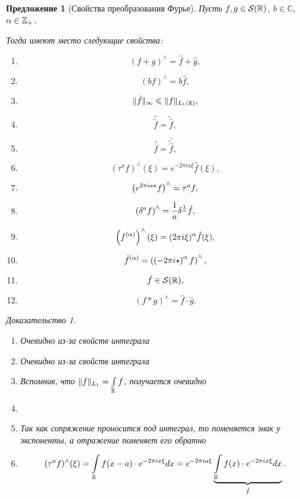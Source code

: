 \documentclass[a5paper, 10pt]{article}
\theoremstyle{definition}
\theoremstyle{plain}
\newtheorem*{Prop}{Предложение}
\theoremstyle{remark}
\newtheorem*{Proof}{Доказательство}
\begin{document}
    \begin{Prop}[Свойства преобразования Фурье]
        Пусть $f,g \in \mathcal{S}(\mathbb{R})$, $b\in \mathbb{C}$, $\alpha\in\mathbb{Z}_+$.

        Тогда имеют место следующие свойства:
         \begin{enumerate}
             \item \[
                     (f+g)^\wedge = \hat{f} + \hat{g},
             \] 
         \item \[
                 (bf)^\wedge = b\hat{f},
         \] 
     \item \[
             \|\hat{f}\|_\infty \leqslant \|f\|_{L_1(\mathbb{R})},
     \] 
 \item \[
         \hat{\tilde{f}} = \tilde{\hat{f}},
 \] 
\item \[
        \hat{\overline{f}} = \overline{\tilde{\hat{f}}},
\] 
\item \[
        (\tau^a f)^\wedge (\xi) = e^{-2\pi i a \xi} \hat{f}(\xi),
\] 
\item \[
        \left(e^{2\pi i a \star} f\right)^\wedge = \tau^a f,
\] 
\item \[
        \left(\delta^a f\right)^\wedge = \frac1a \delta^{\frac{1}{a}} \hat{f},
\] 
\item \[
    \left(f^{(\alpha)}\right)^\wedge (\xi) = (2\pi i \xi)^\alpha \hat{f}(\xi),
\] 
\item \[
        \hat{f}^{(\alpha)} = \left(\left(-2\pi i \star\right)^\alpha f\right)^\wedge,
\] 
\item \[
    \hat{f} \in \mathcal{S}(\mathbb{R}),
\] 
\item \[
        (f*g)^\wedge = \hat{f} \cdot \hat{g}.
\] 
        \end{enumerate}
        \begin{Proof}
            \begin{enumerate}
                \item Очевидно из-за свойств интеграла
                \item Очевидно из-за свойств интеграла
                \item Вспомнив, что $\|f\|_{L_1} = \int\limits_{\mathbb{R}} f$, получается очевидно
                \item 
                \item Так как сопряжение проносится под интеграл, то поменяется знак у экспоненты, а отражение поменяет его обратно
                \item \[
                    (\tau^a f)^\wedge (\xi) = \int\limits_{\mathbb{R}} f(x-a) \cdot e^{-2\pi i x \xi} dx = e^{-2\pi i a \xi} \underbrace{\int\limits_{\mathbb{R}} f(x) \cdot e^{-2\pi i x \xi} dx}_{\hat{f}}.
\]
\end{enumerate}
\end{Proof}
\end{Prop}
\end{document}
